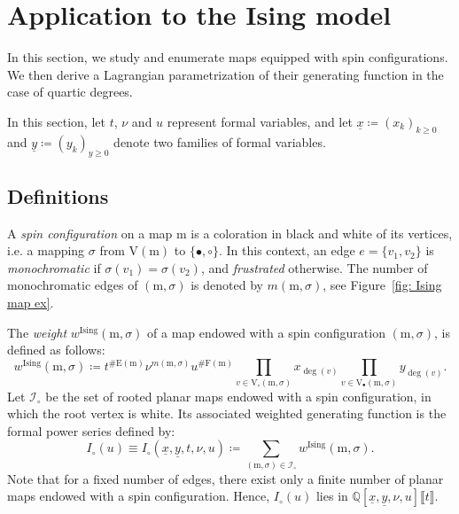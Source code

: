\documentclass[11pt,reqno,tbtags]{amsart}
\providecommand{\Q}{}
\renewcommand{\Q}{\mathbb{Q}}
\newcommand{\rV}{\mathrm{V}}
\renewcommand{\rm}{\mathrm{m}}
\newcommand{\ux}{\underline{x}}
\newcommand{\uy}{\underline{y}}
\numberwithin{equation}{section}
\numberwithin{theo}{section}
\theoremstyle{definition}
\begin{document}
\section{Application to the Ising model}\label{sec5}

In this section, we study and enumerate maps equipped with spin configurations. We then derive a Lagrangian parametrization of their generating function in the case of quartic degrees.  

In this section, let $t$, $\nu$ and $u$ represent formal variables, and let $\ux\coloneqq \left(x_k\right)_{k\geq 0}$ and $\uy\coloneqq \left(y_k\right)_{y\geq 0}$ denote two families of formal variables.



	\subsection{Definitions} 
A \emph{spin configuration} on a map $\rm$ is a coloration in black and white of its vertices, i.e. a mapping $\sigma$ from $\rV(\rm)$ to $\{\bullet,\circ\}$. In this context, an edge $e=\{v_1,v_2\}$ is \emph{monochromatic} if $\sigma(v_1)=\sigma(v_2)$, and \emph{frustrated} otherwise. The number of monochromatic edges of  $(\rm,\sigma)$ is denoted by  $m(\rm,\sigma)$, see Figure~\ref{fig: Ising map ex}.

The \emph{weight} $w^{\mathrm{Ising}}(\rm,\sigma)$ of a map endowed with a spin configuration $(\rm,\sigma)$, is defined 
as follows:
\begin{equation}\label{eq:weightIsing}
	w^{\mathrm{Ising}}(\rm,\sigma) \coloneqq t^{\#\mathrm{E}(\rm)}\nu^{m(\rm,\sigma)}u^{\#\mathrm{F}(\rm)}\prod_{v\in \rV_\circ(\rm,\sigma)}x_{\deg(v)}\prod_{v\in \rV_\bullet(\rm,\sigma)}y_{\deg(v)}. 
\end{equation}
Let $\mathcal{I}_\circ$ be the set of rooted planar maps endowed with a spin configuration, in which the root vertex is white. Its associated weighted generating function is the formal power series
defined by:
\begin{equation}\label{eq: def gf I}
	I_\circ(u) \equiv I_\circ(\ux,\uy,t,\nu, u) \coloneqq \sum\limits_{(\rm,\sigma)\in\mathcal{I}_\circ}{w^\mathrm{Ising}(\rm,\sigma)}.
\end{equation}
Note that for a fixed number of edges, there exist only a finite number of planar maps endowed with a spin configuration. Hence, $I_\circ(u)$ lies in $\mathbb{Q}[\ux,\uy,\nu,u]\llbracket t \rrbracket$. 
\end{document}
